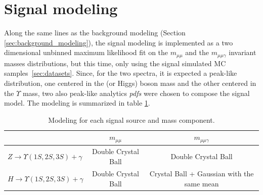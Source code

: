 \clearpage
\section{Signal modeling}

Along the same lines as the background modeling (Section \ref{sec:background_modeling}), the signal modeling is implemented as a two dimensional unbinned maximum likelihood fit on the $m_{\mu\mu}$ and the $m_{\mu\mu\gamma}$ invariant masses distributions, but this time, only using the signal simulated MC samples~\ref{sec:datasets}. Since, for the two spectra, it is expected a peak-like distribution, one centered in the \Z (or Higgs) boson mass and the other centered in the $\Upsilon$ mass, two also peak-like analytics \textit{pdfs} were chosen to compose the signal model. The modeling is summarized in table \ref{tab:SignalModeling}.





\begin{table}[ht]
\begin{center}
\begin{tabular}{l|c|c}
                         & \boldmath$m_{\mu\mu}$                                          & \boldmath$m_{\mu\mu\gamma}$       \\ \hline 
\textbf{\boldmath$Z \rightarrow \Upsilon(1S,2S,3S) +\gamma$}       & Double Crystal Ball & Double Crystal Ball      \\ \hline
\textbf{\boldmath$H \rightarrow \Upsilon(1S,2S,3S) +\gamma$} & Double Crystal Ball & Crystal Ball + Gaussian with the same mean  \\ 
\end{tabular}

\caption{Modeling for each signal source and mass component.}
\label{tab:SignalModeling}
\end{center}
\end{table}




